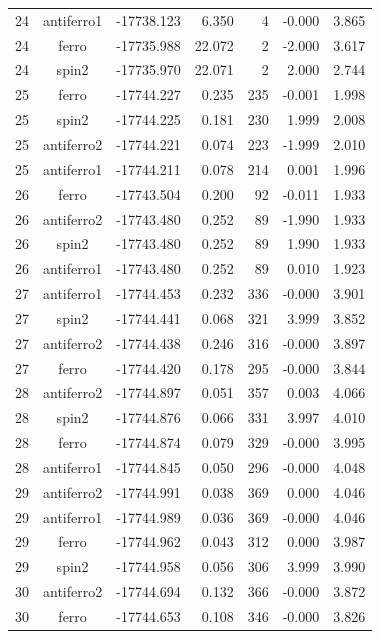 \begin{longtable}{@{}ccrrrrr@{}}
24 & antiferro1 & -17738.123 & 6.350 & 4 & -0.000 & 3.865 \\
24 & ferro & -17735.988 & 22.072 & 2 & -2.000 & 3.617 \\
24 & spin2 & -17735.970 & 22.071 & 2 & 2.000 & 2.744 \\
\rowcolor{gray!20} 25 & ferro & -17744.227 & 0.235 & 235 & -0.001 & 1.998 \\
25 & spin2 & -17744.225 & 0.181 & 230 & 1.999 & 2.008 \\
25 & antiferro2 & -17744.221 & 0.074 & 223 & -1.999 & 2.010 \\
25 & antiferro1 & -17744.211 & 0.078 & 214 & 0.001 & 1.996 \\
\rowcolor{gray!20} 26 & ferro & -17743.504 & 0.200 & 92 & -0.011 & 1.933 \\
26 & antiferro2 & -17743.480 & 0.252 & 89 & -1.990 & 1.933 \\
26 & spin2 & -17743.480 & 0.252 & 89 & 1.990 & 1.933 \\
26 & antiferro1 & -17743.480 & 0.252 & 89 & 0.010 & 1.923 \\
\rowcolor{gray!20} 27 & antiferro1 & -17744.453 & 0.232 & 336 & -0.000 & 3.901 \\
27 & spin2 & -17744.441 & 0.068 & 321 & 3.999 & 3.852 \\
27 & antiferro2 & -17744.438 & 0.246 & 316 & -0.000 & 3.897 \\
27 & ferro & -17744.420 & 0.178 & 295 & -0.000 & 3.844 \\
\rowcolor{gray!20} 28 & antiferro2 & -17744.897 & 0.051 & 357 & 0.003 & 4.066 \\
28 & spin2 & -17744.876 & 0.066 & 331 & 3.997 & 4.010 \\
28 & ferro & -17744.874 & 0.079 & 329 & -0.000 & 3.995 \\
28 & antiferro1 & -17744.845 & 0.050 & 296 & -0.000 & 4.048 \\
\rowcolor{gray!20} 29 & antiferro2 & -17744.991 & 0.038 & 369 & 0.000 & 4.046 \\
29 & antiferro1 & -17744.989 & 0.036 & 369 & -0.000 & 4.046 \\
29 & ferro & -17744.962 & 0.043 & 312 & 0.000 & 3.987 \\
29 & spin2 & -17744.958 & 0.056 & 306 & 3.999 & 3.990 \\
\rowcolor{gray!20} 30 & antiferro2 & -17744.694 & 0.132 & 366 & -0.000 & 3.872 \\
30 & ferro & -17744.653 & 0.108 & 346 & -0.000 & 3.826 \\

\end{longtable}
